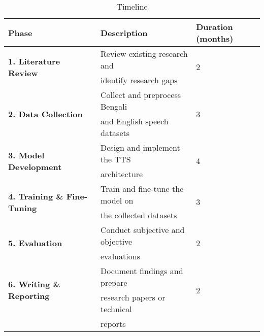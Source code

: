 \begin{table}[h!]
    \centering
    \caption{Timeline}
    \begin{tabular}{lll}
    \toprule
    \textbf{Phase} & \textbf{Description} & \textbf{Duration (months)} \\
    \midrule
    \multirow{2}{*}{\textbf{1. Literature Review}} & Review existing research and & \multirow{2}{*}{2} \\
     & identify research gaps &  \\
    
     \midrule
    \multirow{2}{*}{\textbf{2. Data Collection}} & Collect and preprocess Bengali & \multirow{2}{*}{3} \\
     & and English speech datasets & \\
    
     \midrule
    \multirow{2}{*}{\textbf{3. Model Development}} & Design and implement the TTS & \multirow{2}{*}{4} \\
     & architecture &  \\

    \midrule
    \multirow{2}{*}{\textbf{4. Training \& Fine-Tuning}} & Train and fine-tune the model on & \multirow{2}{*}{3} \\
     & the collected datasets & \\
    
    \midrule
    \multirow{2}{*}{\textbf{5. Evaluation}} & Conduct subjective and objective & \multirow{2}{*}{2} \\
     & evaluations & \\
    
    \midrule
    \multirow{2}{*}{\textbf{6. Writing \& Reporting}} & Document findings and prepare & \multirow{2}{*}{2} \\
     & research papers or technical & \\
     & reports & \\
    \bottomrule
    \end{tabular}
\end{table}